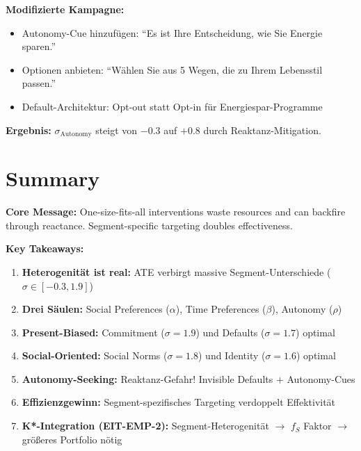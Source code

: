 \textbf{Modifizierte Kampagne:}
\begin{itemize}
\item Autonomy-Cue hinzufügen: ``Es ist Ihre Entscheidung, wie Sie Energie sparen.''
\item Optionen anbieten: ``Wählen Sie aus 5 Wegen, die zu Ihrem Lebensstil passen.''
\item Default-Architektur: Opt-out statt Opt-in für Energiespar-Programme
\end{itemize}

\textbf{Ergebnis:} $\sigma_{\text{Autonomy}}$ steigt von $-0.3$ auf $+0.8$ durch Reaktanz-Mitigation.


\section{Summary}
\label{sec:19-summary}

\begin{tcolorbox}[colback=green!10!white, colframe=green!75!black,
    title=Key Points]

\textbf{Core Message:} One-size-fits-all interventions waste resources and can backfire through reactance. Segment-specific targeting doubles effectiveness.

\textbf{Key Takeaways:}
\begin{enumerate}
\item \textbf{Heterogenität ist real:} ATE verbirgt massive Segment-Unterschiede ($\sigma \in [-0.3, 1.9]$)
\item \textbf{Drei Säulen:} Social Preferences ($\alpha$), Time Preferences ($\beta$), Autonomy ($\rho$)
\item \textbf{Present-Biased:} Commitment ($\sigma = 1.9$) und Defaults ($\sigma = 1.7$) optimal
\item \textbf{Social-Oriented:} Social Norms ($\sigma = 1.8$) und Identity ($\sigma = 1.6$) optimal
\item \textbf{Autonomy-Seeking:} Reaktanz-Gefahr! Invisible Defaults + Autonomy-Cues
\item \textbf{Effizienzgewinn:} Segment-spezifisches Targeting verdoppelt Effektivität
\item \textbf{K*-Integration (EIT-EMP-2):} Segment-Heterogenität $\to$ $f_S$ Faktor $\to$ größeres Portfolio nötig
\end{enumerate}

\end{tcolorbox}

